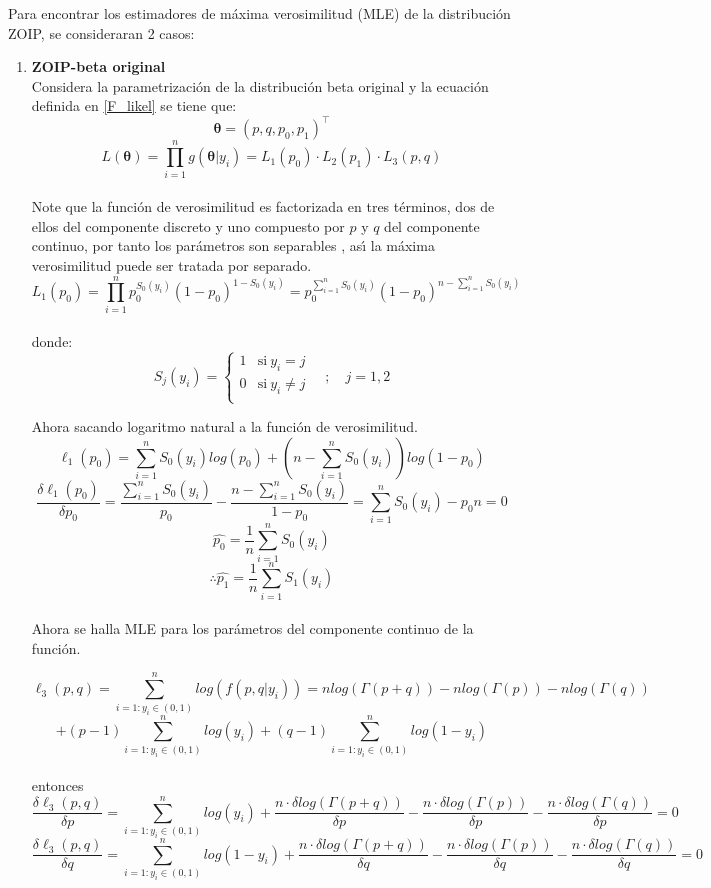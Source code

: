 Para encontrar los estimadores de m\'{a}xima verosimilitud (MLE) de la distribuci\'{o}n ZOIP, se consideraran 2 casos:

\begin{enumerate}
	\item \textbf{ZOIP-beta original}\\
	Considera la parametrizaci\'{o}n de la distribuci\'{o}n beta original  y la ecuaci\'{o}n definida en \eqref{F_likel} se tiene que:
	\[
	\boldsymbol{\theta}=(p,q,p_0,p_1)^{\top}
	\]
	\[
	L(\boldsymbol{\theta})=\prod_{i=1}^{n}g(\boldsymbol{\theta}|y_i)=L_1(p_0)\cdot L_2(p_1) \cdot L_3(p,q)
	\]
	\\
Note que la funci\'{o}n de verosimilitud es factorizada en tres t\'{e}rminos, dos de ellos del componente discreto y uno compuesto por $p$ y $q$ del componente continuo, por tanto los par\'{a}metros son separables \citep{Pace1}, as\'{\i} la m\'{a}xima verosimilitud puede ser tratada por separado.\\
\[
L_1(p_0)=\prod_{i=1}^{n}p_0^{S_0(y_i)}(1-p_0)^{1-S_0(y_i)}=p_0^{\sum_{i=1}^{n}{S_0(y_i)}}(1-p_0)^{n-\sum_{i=1}^{n}{S_0(y_i)}}
\]
\\
donde:
\begin{equation}
S_j(y_i)=
\begin{cases}
1 & \text{si}\ y_i=j\\
0 & \text{si}\ y_i\neq j\\
\end{cases}
\quad ; \quad j=1,2 \label{Sj}
\end{equation}

Ahora sacando logaritmo natural a la funci\'{o}n de verosimilitud.
\[
\ell_1(p_0)=\sum_{i=1}^{n}{S_0(y_i)log(p_0)}+(n-\sum_{i=1}^{n}{S_0(y_i)})log(1-p_0)
\]	
\[
\frac{\delta \ell_1(p_0)}{\delta p_0}=\frac{\sum_{i=1}^{n}{S_0(y_i)}}{p_0}-\frac{n-\sum_{i=1}^{n}{S_0(y_i)}}{1-p_0}=\sum_{i=1}^{n}{S_0(y_i)}-p_0n=0
\]
\[
\hat{p_0}=\frac{1}{n}\sum_{i=1}^{n}{S_0(y_i)}
\]
\[
\therefore \hat{p_1}=\frac{1}{n}\sum_{i=1}^{n}{S_1(y_i)}
\]
\\
Ahora se halla MLE para los par\'{a}metros del componente continuo de la funci\'{o}n.

\[
\ell_3(p,q)=\sum_{i=1:y_i \in (0,1)}^{n}{log(f(p,q|y_i))}=n log(\Gamma(p+q))-n log(\Gamma(p))-n log(\Gamma(q))
\]
\[
+(p-1)\sum_{i=1:y_i \in (0,1)}^{n}{log(y_i)}+(q-1)\sum_{i=1:y_i \in (0,1)}^{n}{log(1-y_i)}
\]
\\
entonces
\[
\frac{\delta \ell_3(p,q)}{\delta p}=\sum_{i=1:y_i \in (0,1)}^{n}{log(y_i)}+\frac{n \cdot \delta log(\Gamma(p+q))}{\delta p}- \frac{n \cdot \delta log(\Gamma(p))}{\delta p}-\frac{n\cdot \delta log(\Gamma(q))}{\delta p}=0
\]
\[
\frac{\delta \ell_3(p,q)}{\delta q}=\sum_{i=1:y_i \in (0,1)}^{n}{log(1-y_i)}+\frac{n \cdot \delta log(\Gamma(p+q))}{\delta q}- \frac{n \cdot \delta log(\Gamma(p))}{\delta q}-\frac{n\cdot \delta log(\Gamma(q))}{\delta q}=0
\]


\end{enumerate}
